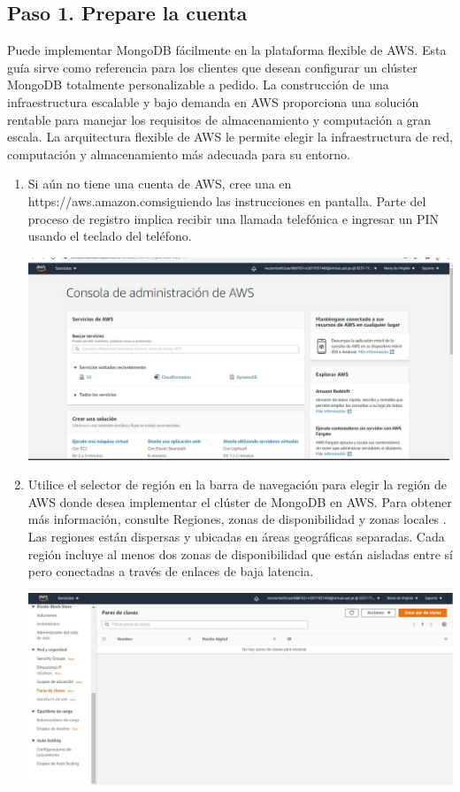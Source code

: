 \documentclass[12pt,letterpaper]{article}
\begin{document}
	
	\subsection{Paso 1. Prepare la cuenta}
\item	Puede implementar MongoDB fácilmente en la plataforma flexible de AWS. Esta guía sirve como referencia para los clientes que desean configurar un clúster MongoDB totalmente personalizable a pedido. La construcción de una infraestructura escalable y bajo demanda en AWS proporciona una solución rentable para manejar los requisitos de almacenamiento y computación a gran escala. La arquitectura flexible de AWS le permite elegir la infraestructura de red, computación y almacenamiento más adecuada para su entorno.
	\begin{enumerate}
		
		\item Si aún no tiene una cuenta de AWS, cree una en https://aws.amazon.comsiguiendo las instrucciones en pantalla. Parte del proceso de registro implica recibir una llamada telefónica e ingresar un PIN usando el teclado del teléfono.
		\begin{center}
			\includegraphics[width=14cm]{./img/1.1.jpg} 
		\end{center}
		\item Utilice el selector de región en la barra de navegación para elegir la región de AWS donde desea implementar el clúster de MongoDB en AWS. Para obtener más información, consulte Regiones, zonas de disponibilidad y zonas locales . Las regiones están dispersas y ubicadas en áreas geográficas separadas. Cada región incluye al menos dos zonas de disponibilidad que están aisladas entre sí pero conectadas a través de enlaces de baja latencia.
		\begin{center}
			\includegraphics[width=14cm]{./img/1.2.1.jpg} 

\end{center}
\end{enumerate}
\end{document}
